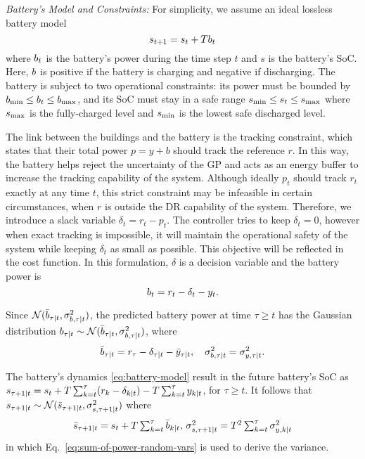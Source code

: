 \noindent
\textit{Battery's Model and Constraints:}
For simplicity, we assume an ideal lossless battery model
\begin{equation}
\label{eq:battery-model}
s_{t+1} = s_t + T \Pbatt_t
\end{equation}
where \(\Pbatt_t\) is the battery's power during the time step \(t\) and \(s\) is the battery's SoC.
Here, \(\Pbatt\) is positive if the battery is charging and negative if discharging.
The battery is subject to two operational constraints:
its power must be bounded by \(\Pbmin \leq \Pbatt_t \leq \Pbmax\), 
and its SoC must stay in a safe range \(\SOCmin \leq s_t \leq\SOCmax\) where \(\SOCmax\) is the fully-charged level and \(\SOCmin\) is the lowest safe discharged level. 

The link between the buildings and the battery is the tracking constraint, which states that their total power \(p = y + b\) should track the reference \(r\).
In this way, the battery helps reject the uncertainty of the GP and acts as an energy buffer to increase the tracking capability of the system. Although ideally \(p_t\) should track \(r_t\) exactly at any time \(t\), this strict constraint may be infeasible in certain circumstances, \eg when \(r\) is outside the DR capability of the system.
Therefore, we introduce a slack variable \(\delta_t = r_t - p_t\).
The controller tries to keep \(\delta_t = 0\), however when exact tracking is impossible, it will maintain the operational safety of the system while keeping \(\delta_t\)  as small as possible.
This objective will be reflected in the cost function. 
In this formulation, \(\delta\) is a decision variable  and the battery power is
\begin{equation}
\label{eq:battery-power}
\Pbatt_t = r_t - \delta_t - y_t \text.
\end{equation}


Since \(\GaussianDistSmall{\predict{\tau}{\bar{\Pbatt}}}{\predict{b,\tau}{\sigma^2}}\), the predicted battery power at time \(\tau \geq t\) has the Gaussian distribution \(\predict{\tau}{\Pbatt} \sim 
\GaussianDistSmall{\predict{\tau}{\bar{\Pbatt}}}{\predict{b,\tau}{\sigma^2}}\), where
\begin{equation}
\label{eq:predicted-battery-power}
\predict{\tau}{\bar{\Pbatt}} = r_\tau - \predict{\tau}{\delta} - \predict{\tau}{\bar{y}}, \quad
\predict{b,\tau}{\sigma^2} =  \predict{y,\tau}{\sigma^2} \text.
\end{equation}

The battery's dynamics \eqref{eq:battery-model} result in the future battery's SoC as
\(\predict{\tau+1}{s} = s_t + T \textstyle\sum_{k=t}^\tau (r_k - \predict{k}{\delta}) - T \textstyle\sum_{k=t}^\tau \predict{k}{y}\),
for \(\tau \geq t\).
It follows that \(\predict{\tau+1}{s} \sim \GaussianDistSmall{\predict{\tau+1}{\bar{s}}}{\predict{s,\tau+1}{\sigma^2}}\) where
\begin{equation}
\label{eq:predicted-battery-soc}
\predict{\tau+1}{\bar{s}} = s_t + T \textstyle\sum_{k=t}^\tau \predict{k}{\bar{\Pbatt}}, \,
\predict{s,\tau+1}{\sigma^2} = T^2 \textstyle\sum_{k=t}^\tau \predict{y,k}{\sigma^2} 
\end{equation}
in which Eq.~\eqref{eq:sum-of-power-random-vars} is used to derive the variance.


